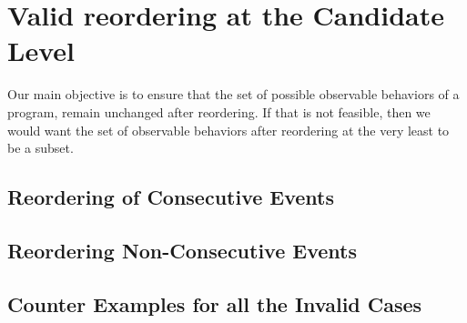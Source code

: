 
\section{Valid reordering at the Candidate Level}
    

Our main objective is to ensure that the set of possible observable behaviors of a program, remain unchanged after reordering. If that is not feasible, then we would want the set of observable behaviors after reordering at the very least to be a subset.

    \subsection{Reordering of Consecutive Events}
        

        

    \subsection{Reordering Non-Consecutive Events}

        

    \subsection{Counter Examples for all the Invalid Cases}
        

